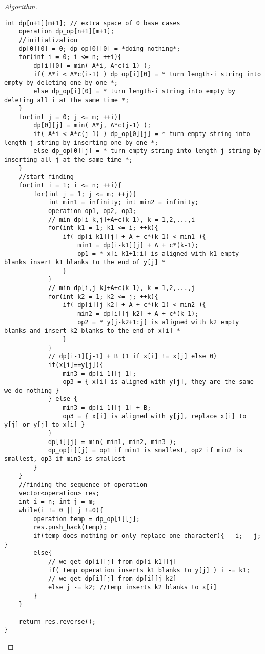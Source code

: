 \documentclass[openany]{article}
\begin{document}
\begin{proof}[Algorithm]{}
\begin{lstlisting}[basicstyle=\fontsize{8}{9}\selectfont\ttfamily]
    int dp[n+1][m+1]; // extra space of 0 base cases
    operation dp_op[n+1][m+1];
    //initialization
    dp[0][0] = 0; dp_op[0][0] = *doing nothing*;
    for(int i = 0; i <= n; ++i){
        dp[i][0] = min( A*i, A*c(i-1) );
        if( A*i < A*c(i-1) ) dp_op[i][0] = * turn length-i string into empty by deleting one by one *;
        else dp_op[i][0] = * turn length-i string into empty by deleting all i at the same time *;
    }
    for(int j = 0; j <= m; ++i){
        dp[0][j] = min( A*j, A*c(j-1) );
        if( A*i < A*c(j-1) ) dp_op[0][j] = * turn empty string into length-j string by inserting one by one *;
        else dp_op[0][j] = * turn empty string into length-j string by inserting all j at the same time *;
    }
    //start finding
    for(int i = 1; i <= n; ++i){
        for(int j = 1; j <= m; ++j){
            int min1 = infinity; int min2 = infinity;
            operation op1, op2, op3;
            // min dp[i-k,j]+A+c(k-1), k = 1,2,...,i
            for(int k1 = 1; k1 <= i; ++k){
                if( dp[i-k1][j] + A + c*(k-1) < min1 ){
                    min1 = dp[i-k1][j] + A + c*(k-1);
                    op1 = * x[i-k1+1:i] is aligned with k1 empty blanks insert k1 blanks to the end of y[j] *
                }
            }
            // min dp[i,j-k]+A+c(k-1), k = 1,2,...,j
            for(int k2 = 1; k2 <= j; ++k){
                if( dp[i][j-k2] + A + c*(k-1) < min2 ){
                    min2 = dp[i][j-k2] + A + c*(k-1);
                    op2 = * y[j-k2+1:j] is aligned with k2 empty blanks and insert k2 blanks to the end of x[i] *
                }
            }
            // dp[i-1][j-1] + B (1 if x[i] != x[j] else 0)
            if(x[i]==y[j]){
                min3 = dp[i-1][j-1];
                op3 = { x[i] is aligned with y[j], they are the same we do nothing }
            } else {
                min3 = dp[i-1][j-1] + B;
                op3 = { x[i] is aligned with y[j], replace x[i] to y[j] or y[j] to x[i] }
            }
            dp[i][j] = min( min1, min2, min3 );
            dp_op[i][j] = op1 if min1 is smallest, op2 if min2 is smallest, op3 if min3 is smallest
        }
    }
    //finding the sequence of operation
    vector<operation> res;
    int i = n; int j = m;
    while(i != 0 || j !=0){
        operation temp = dp_op[i][j];
        res.push_back(temp);
        if(temp does nothing or only replace one character){ --i; --j; }
        else{
            // we get dp[i][j] from dp[i-k1][j]
            if( temp operation inserts k1 blanks to y[j] ) i -= k1;
            // we get dp[i][j] from dp[i][j-k2]
            else j -= k2; //temp inserts k2 blanks to x[i]
        }
    }
    
    return res.reverse();
}
		\end{lstlisting} 
\end{proof}
\end{document}
